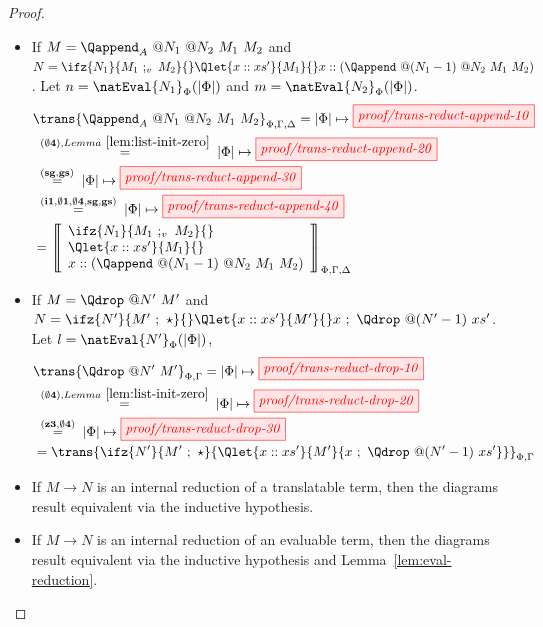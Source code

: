 \begin{proof}
\begin{itemize}
        \item If $M = \Qappend_A\ @N_1\ @N_2\ M_1\ M_2$ and \(N=
            \ifz{N_1}{M_1\ ;_v\ M_2}{}
            \Qlet{x :: xs'}{M_1}{}
            x :: (\Qappend\ @(N_1-1)\ @N_2\ M_1\ M_2)
            \). Let $n = \natEval{N_1}_\Phi(|\Phi|)$ and $m = \natEval{N_2}_\Phi(|\Phi|)$.
            \begin{align*}
                &\trans{\Qappend_A\ @N_1\ @N_2\ M_1\ M_2}_{\Phi,\Gamma,\Delta} =
                |\Phi|\mapsto\tikzfig{proof/trans-reduct-append-10}\\
                &\;\overset{\scriptstyle{{\bf(\emptyset 4)},Lemma~\ref{lem:list-init-zero}}}{=}\;
                |\Phi|\mapsto\tikzfig{proof/trans-reduct-append-20}\\
                &\;\overset{\scriptstyle{{\bf(sg,gs)}}}{=}\;
                |\Phi|\mapsto\tikzfig{proof/trans-reduct-append-30}\\
                &\;\overset{\scriptstyle{{\bf(i1, \emptyset 1, \emptyset 4, sg, gs)}}}{=}\;
                |\Phi|\mapsto\tikzfig{proof/trans-reduct-append-40}\\
                &=
                \left\llbracket\begin{array}{l}
                \ifz{N_1}{M_1\ ;_v\ M_2}{}\\
                \Qlet{x :: xs'}{M_1}{}\\
                x :: (\Qappend\ @(N_1-1)\ @N_2\ M_1\ M_2)
                \end{array}\right\rrbracket_{\Phi,\Gamma,\Delta}
            \end{align*}
            
        \item If $M = \Qdrop\ @N'\ M'$ and \(N=
            \ifz{N'}{M'\ ;\ \star}{} \Qlet{x :: xs'}{M'}{} x\ ;\ \Qdrop\ @(N'-1)\ xs'
            \). Let $l = \natEval{N'}_\Phi(|\Phi|)$,
            \begin{align*}
                &\trans{\Qdrop\ @N'\ M'}_{\Phi,\Gamma}
                =
                |\Phi|\mapsto\tikzfig{proof/trans-reduct-drop-10}\\
                &\;\overset{\scriptstyle{{\bf(\emptyset 4)},Lemma~\ref{lem:list-init-zero}}}{=}\;
                |\Phi|\mapsto\tikzfig{proof/trans-reduct-drop-20}\\
                &\;\overset{\scriptstyle{{\bf(z3,\emptyset 4)}}}{=}\;
                |\Phi|\mapsto\tikzfig{proof/trans-reduct-drop-30}\\
                &= \trans{\ifz{N'}{M'\ ;\ \star}{\Qlet{x :: xs'}{M'}{x\ ;\ \Qdrop\ @(N'-1)\ xs'}}}_{\Phi,\Gamma}
            \end{align*}

        \item If $M \to N$ is an internal reduction of a translatable term,
            then the diagrams result equivalent via the inductive hypothesis.
        \item If $M \to N$ is an internal reduction of an evaluable term,
            then the diagrams result equivalent via the inductive hypothesis
            and Lemma~\ref{lem:eval-reduction}.
    \end{itemize}
\end{proof}